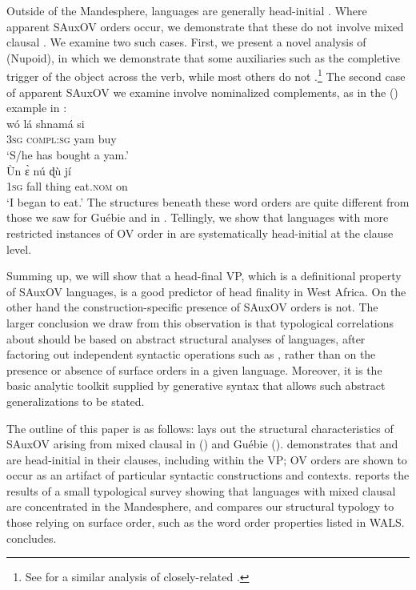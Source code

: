 \documentclass[output=paper,newtxmath,modfonts,nonflat,draftmode]{langsci/langscibook}
\begin{document}
Outside of the Mandesphere, languages are generally head-initial \citep{heine76}. Where apparent SAuxOV orders occur, we demonstrate that these do not involve mixed clausal  \citep{manfredi97,kandy03, aboh09}. We examine two such cases. First, we present a novel analysis of  (Nupoid), in which we demonstrate that some auxiliaries such as the completive trigger  of the object across the verb, while most others do not .\footnote{See \citet{kandy03} for a similar analysis of closely-related .} The second case of apparent SAuxOV we examine involve nominalized complements, as in the  () example in :
\ea \label{ex:2:fakesauxov}
\ea {} \label{ex:2a:gwari}\\
\gll wó lá shnamá si \\
3\textsc{sg} \textsc{compl:sg} yam buy \\
\glt `S/he has bought a yam.'
\ex {} \label{ex:2b:gwari} \\	
\gll Ùn {\`ɛ} {nú} {ɖù} jí  \\
1\textsc{sg} fall thing eat.\textsc{nom} on  \\
\glt `I began to eat.'
\z
\z
The structures beneath these word orders are quite different from those we saw for Guébie and  in . Tellingly, we show that languages with more restricted instances of OV order in  are systematically head-initial at the clause level. 

Summing up, we will show that a head-final VP, which is a definitional property of SAuxOV languages, is a good predictor of head finality in West Africa. On the other hand the construction-specific presence of SAuxOV orders is not. The larger conclusion we draw from this observation is that typological correlations about  should be based on abstract structural analyses of languages, after factoring out independent syntactic operations such as , rather than on the presence or absence of surface orders in a given language. Moreover, it is the basic analytic toolkit supplied by generative syntax that allows such abstract generalizations to be stated.
 
 The outline of this paper is as follows:  lays out the structural characteristics of SAuxOV arising from mixed clausal  in  () and Guébie ().  demonstrates that  and  are head-initial in their clauses, including within the VP; OV orders are shown to occur as an artifact of particular syntactic constructions and contexts.  reports the results of a small typological survey showing that languages with mixed clausal  are concentrated in the Mandesphere, and compares our structural typology to those relying on surface order, such as the word order properties listed in WALS.  concludes. 
\end{document}
